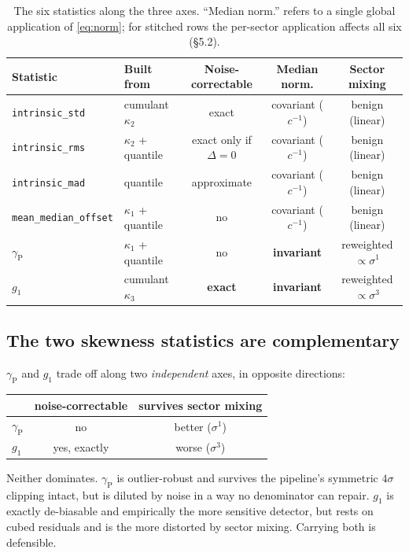 \documentclass[11pt]{article}
\newcommand{\istd}{\texttt{intrinsic\_std}}
\newcommand{\irms}{\texttt{intrinsic\_rms}}
\newcommand{\imad}{\texttt{intrinsic\_mad}}
\newcommand{\moff}{\texttt{mean\_median\_offset}}
\newcommand{\gp}{\gamma_{\mathrm{P}}}
\begin{document}
\begin{table}[htbp]
\centering
\small
\caption{The six statistics along the three axes. ``Median norm.'' refers to a
single global application of \eqref{eq:norm}; for stitched rows the per-sector
application affects all six (\S5.2).}
\label{tab:summary}
\begin{tabular}{llccc}
\toprule
Statistic & Built from & Noise-correctable & Median norm. & Sector mixing \\
\midrule
\istd  & cumulant $\kappa_2$      & exact           & covariant ($c^{-1}$) & benign (linear) \\
\irms  & $\kappa_2$ + quantile    & exact only if $\Delta\!=\!0$ & covariant ($c^{-1}$) & benign (linear) \\
\imad  & quantile                 & approximate     & covariant ($c^{-1}$) & benign (linear) \\
\moff  & $\kappa_1$ + quantile    & no              & covariant ($c^{-1}$) & benign (linear) \\
$\gp$  & $\kappa_1$ + quantile    & no              & \textbf{invariant}   & reweighted $\propto\sigma^{1}$ \\
$g_1$  & cumulant $\kappa_3$      & \textbf{exact}  & \textbf{invariant}   & reweighted $\propto\sigma^{3}$ \\
\bottomrule
\end{tabular}
\end{table}

\subsection{The two skewness statistics are complementary}

$\gp$ and $g_1$ trade off along two \emph{independent} axes, in opposite
directions:

\begin{center}
\begin{tabular}{lcc}
\toprule
 & noise-correctable & survives sector mixing \\
\midrule
$\gp$ & no             & better ($\sigma^1$) \\
$g_1$ & yes, exactly   & worse ($\sigma^3$) \\
\bottomrule
\end{tabular}
\end{center}

Neither dominates. $\gp$ is outlier-robust and survives the pipeline's symmetric
$4\sigma$ clipping intact, but is diluted by noise in a way no denominator can
repair. $g_1$ is exactly de-biasable and empirically the more sensitive detector,
but rests on cubed residuals and is the more distorted by sector mixing. Carrying
both is defensible.
\end{document}
